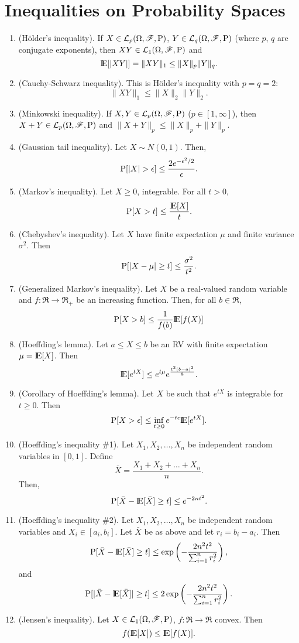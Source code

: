 \documentclass[a4paper,10pt]{article}
\begin{document}
\section{Inequalities on Probability Spaces}
\begin{enumerate}
 \item (H\"older's inequality). If $X\in\mathcal{L}_p(\Omega,\mathscr{F},\mathrm{P})$, $Y\in\mathcal{L}_q(\Omega,\mathscr{F},\mathrm{P})$ (where $p$, $q$ are conjugate exponents), then $XY\in\mathcal{L}_1(\Omega,\mathscr{F},\mathrm{P})$ and \[ \E[|XY|] = \|XY\|_1 \leq \|X\|_p \|Y\|_q.\]
 
 \item (Cauchy-Schwarz inequality). This is H\"older's inequality with $p=q=2$:
 \[
    \|XY\|_1 \leq \|X\|_2 \|Y\|_2.
 \]

 \item (Minkowski inequality). If $X,Y\in\mathcal{L}_p(\Omega,\mathscr{F},\mathrm{P})$ ($p\in [1,\infty]$), then $X+Y\in\mathcal{L}_p(\Omega,\mathscr{F},\mathrm{P})$  and 
       $\|X+Y\|_p \leq \|X\|_p + \|Y\|_p$.
 \item (Gaussian tail inequality). Let $X\sim N(0,1)$. Then,
 \[ 
  \prob[|X|>\epsilon] \leq \frac{2e^{-\epsilon^2/2}}{\epsilon}.
 \]
 \item (Markov's inequality). Let $X\geq 0$, integrable. For all $t>0$, 
 \[ 
 \prob[X>t]\leq \frac{\E[X]}{t}.
 \]
 \item (Chebyshev's inequality). Let $X$ have finite expectation $\mu$ and finite variance $\sigma^2$. Then
 \[
  \mathrm{P}[|X-\mu|\geq t] \leq \frac{\sigma^2}{t^2}.
 \]
 \item (Generalized Markov's inequality). Let $X$ be a real-valued random variable and $f:\Re\to\Re_+$
       be an increasing function. Then, for all $b\in\Re$,
       \[
        \prob[X>b]\leq \frac{1}{f(b)}\E[f(X)]
       \]

 \item (Hoeffding's lemma). Let $a\leq X\leq b$ be an RV with finite expectation $\mu=\E[X]$.
 Then
 \[
  \E[e^{tX}] \leq e^{t\mu}e^{\frac{t^2(b-a)^2}{8}}.
 \]
\item (Corollary of Hoeffding's lemma). Let $X$ be such that $e^{tX}$ is integrable for $t\geq 0$. Then
\[
 \prob[X>\epsilon]\leq \inf_{t\geq 0}e^{-t\epsilon}\E[e^{tX}].
\]
\item (Hoeffding's inequality \#1). Let $X_1,X_2,\ldots, X_n$ be independent random variables in $[0,1]$. Define 
\[
 \bar{X} = \frac{X_1 + X_2 + \ldots + X_n}{n}.
\]
Then,
\[
 \prob[\bar{X} - \E[\bar{X}] \geq t] \leq e^{-2nt^2}.
\]
\item (Hoeffding's inequality \#2). Let $X_1,X_2,\ldots, X_n$ be independent random variables and $X_i\in [a_i, b_i]$.
Let $\bar{X}$ be as above and let $r_i = b_i - a_i$. Then
\[
 \prob[\bar{X} - \E[\bar{X}] \geq t] \leq \exp\left({-\frac{2n^2t^2}{\sum_{i=1}^{n} r_i^2}}\right),
\]
and
\[
 \prob[ |\bar{X} - \E[\bar{X}]| \geq t] \leq 2 \exp\left({-\frac{2n^2t^2}{\sum_{i=1}^{n} r_i^2}}\right).
\]
 \item (Jensen's inequality). Let $X\in\mathcal{L}_1(\Omega,\mathscr{F},\mathrm{P})$, $f:\Re\to\Re$ convex. Then
   \[
     f(\E[X])\leq \E[f(X)].
    \]


\end{enumerate}
\end{document}
